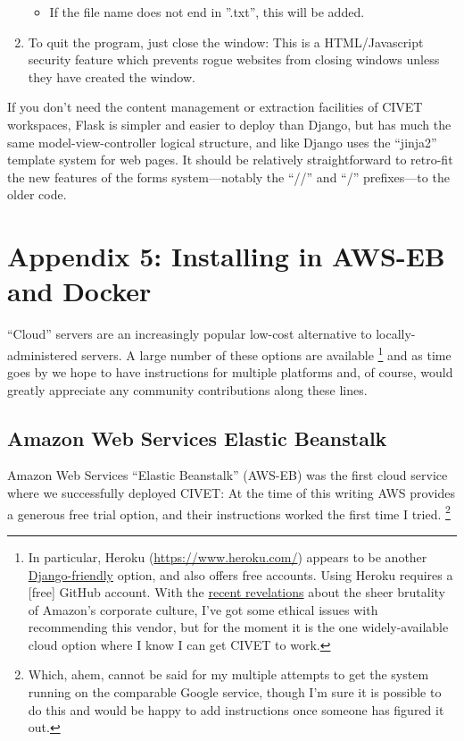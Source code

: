 \documentclass[letterpaper,10pt,english]{sphinxmanual}
\begin{document}
\begin{enumerate}
\begin{itemize}
\item {} 
If the file name does not end in ''.txt'', this will be
added.

\end{itemize}

\item {} 
To quit the program, just close the window: This is a HTML/Javascript security feature which
prevents rogue websites from closing windows unless they have created
the window.

\end{enumerate}

If you don't need the content management or extraction facilities of CIVET
workspaces, Flask is simpler and easier to deploy than Django, but has much
the same model-view-controller logical structure, and like Django uses the
“jinja2” template system for web pages. It should be relatively
straightforward to retro-fit the new features of the forms system—notably
the “//” and “/” prefixes—to the older code.


\chapter{Appendix 5: Installing in AWS-EB and Docker}
\label{appendix5:appendix-5-installing-in-aws-eb-and-docker}\label{appendix5::doc}
“Cloud” servers are an increasingly popular low-cost alternative to locally-administered servers. A large number of these
options are available \footnote{
In particular, Heroku (\href{https://www.heroku.com/}{https://www.heroku.com/}) appears to be another
\href{https://devcenter.heroku.com/articles/getting-started-with-django}{Django-friendly} option, and also offers free accounts.
Using Heroku requires a {[}free{]} GitHub account. With the
\href{http://www.nytimes.com/2015/08/16/technology/inside-amazon-wrestling-big-ideas-in-a-bruising-workplace.html}{recent revelations}
about the sheer brutality of Amazon's corporate culture, I've got some
ethical issues with recommending this vendor, but for the moment it is
the one widely-available cloud option where I know I can get CIVET to work.
} and as time goes by we hope to have instructions for multiple platforms and,
of course, would greatly appreciate any community contributions along these lines.


\section{Amazon Web Services Elastic Beanstalk}
\label{appendix5:amazon-web-services-elastic-beanstalk}
Amazon Web Services “Elastic Beanstalk” (AWS-EB) was the first cloud service where we
successfully deployed CIVET: At the time of this writing AWS provides a generous free trial
option, and their instructions worked the first time I tried. \footnote{
Which, ahem, cannot be said for my multiple attempts to get the system running on the comparable Google service,
though I'm sure it is possible to do this and would be happy to add instructions once someone has figured it
out.
}
\end{document}

